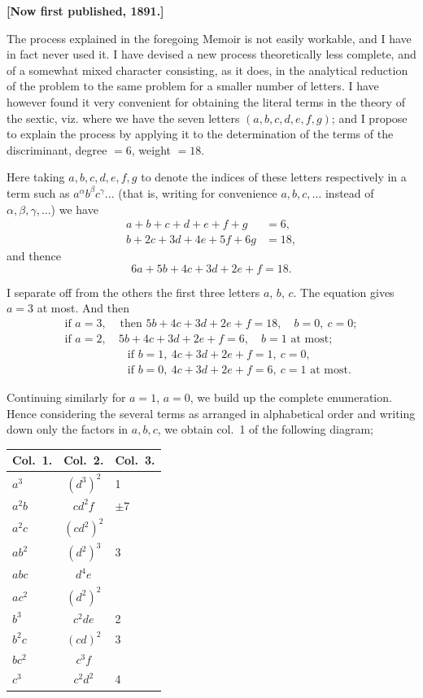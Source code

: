 \documentclass[11pt,a4paper]{book}
\begin{document}
\textbf{[Now first published, 1891.]}

The process explained in the foregoing Memoir is not easily workable, and I have in fact never used it. I have devised a new process theoretically less complete, and of a somewhat mixed character consisting, as it does, in the analytical reduction of the problem to the same problem for a smaller number of letters. I have however found it very convenient for obtaining the literal terms in the theory of the sextic, viz. where we have the seven letters $(a,b,c,d,e,f,g)$; and I propose to explain the process by applying it to the determination of the terms of the discriminant, degree $=6$, weight $=18$.

Here taking $a,b,c,d,e,f,g$ to denote the indices of these letters respectively in a term such as $a^\alpha b^\beta c^\gamma\ldots$ (that is, writing for convenience $a,b,c,\ldots$ instead of $\alpha,\beta,\gamma,\ldots$) we have
\begin{align*}
a+b+c+d+e+f+g &= 6,\\
b+2c+3d+4e+5f+6g &= 18,
\end{align*}
and thence
\[
6a+5b+4c+3d+2e+f=18.
\]

I separate off from the others the first three letters $a$, $b$, $c$. The equation gives $a=3$ at most. And then
\begin{align*}
\text{if }a=3,&\text{ then }5b+4c+3d+2e+f=18,\quad b=0,\ c=0;\\
\text{if }a=2,&\ 5b+4c+3d+2e+f=6,\quad b=1\text{ at most};\\
&\quad\text{if }b=1,\ 4c+3d+2e+f=1,\ c=0,\\
&\quad\text{if }b=0,\ 4c+3d+2e+f=6,\ c=1\text{ at most}.
\end{align*}

Continuing similarly for $a=1$, $a=0$, we build up the complete enumeration. Hence considering the several terms as arranged in alphabetical order and writing down only the factors in $a,b,c$, we obtain col.~1 of the following diagram;

\begin{center}
\begin{tabular}{lcl}
Col.~1. & Col.~2. & Col.~3. \\
\midrule
$a^3$ & $(d^3)^2$ & 1 \\
$a^2b$ & $cd^2f$ & $\pm7$ \\
$a^2c$ & $(cd^2)^2$ & \\
$ab^2$ & $(d^2)^3$ & 3 \\
$abc$ & $d^4e$ & \\
$ac^2$ & $(d^2)^2$ & \\
$b^3$ & $c^2de$ & 2 \\
$b^2c$ & $(cd)^2$ & 3 \\
$bc^2$ & $c^3f$ & \\
$c^3$ & $c^2d^2$ & 4 \\
\end{tabular}
\end{center}
\end{document}
